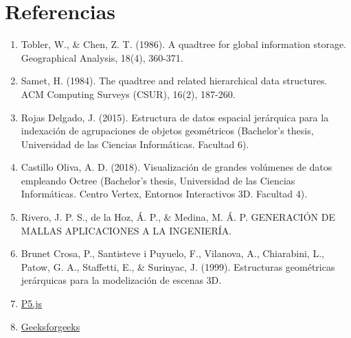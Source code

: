\documentclass{article}
\begin{document}
\section{Referencias}
\begin{enumerate}
	\item Tobler, W., & Chen, Z. T. (1986). A quadtree for global information storage. Geographical Analysis, 18(4), 360-371.

	\item Samet, H. (1984). The quadtree and related hierarchical data structures. ACM Computing Surveys (CSUR), 16(2), 187-260.

	\item Rojas Delgado, J. (2015). Estructura de datos espacial jerárquica para la indexación de agrupaciones de objetos geométricos (Bachelor's thesis, Universidad de las Ciencias Informáticas. Facultad 6).

	\item Castillo Oliva, A. D. (2018). Visualización de grandes volúmenes de datos empleando Octree (Bachelor's thesis, Universidad de las Ciencias Informáticas. Centro Vertex, Entornos Interactivos 3D. Facultad 4).

	\item Rivero, J. P. S., de la Hoz, Á. P., & Medina, M. Á. P. GENERACIÓN DE MALLAS APLICACIONES A LA INGENIERÍA.

	\item Brunet Crosa, P., Santisteve i Puyuelo, F., Vilanova, A., Chiarabini, L., Patow, G. A., Staffetti, E., & Surinyac, J. (1999). Estructuras geométricas jerárquicas para la modelización de escenas 3D.

	\item \href{https://p5js.org/es/libraries/}{P5.js}
	\item \href{https://www.geeksforgeeks.org/}{Geeksforgeeks}

\end{enumerate}
\end{document}
